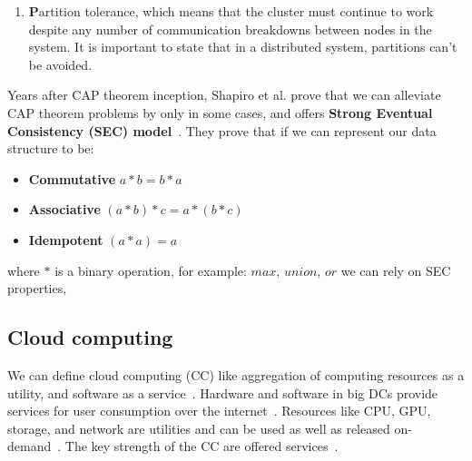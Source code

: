\begin{enumerate} [start=1,label={(\bfseries \arabic*)}]
	We can calculate availability class if we have system availability $A$, the system's availability class is define as~\cite{GrayS91}: 
	
	\begin{equation} 
		e^{\log_{10} \frac{1}{ (1 - A)}} 
	\end{equation}
	It is important to notice that even a 99\% available system gives almost four days of downtime in a year, which is unacceptable for services like Facebook, Google, AWS etc. And when service is down, companies are loosing customers.
	\item \textbf{P}artition tolerance, which means that the cluster must continue to work despite any number of communication breakdowns between nodes in the system. It is important to state that in a distributed system, partitions can’t be avoided.
\end{enumerate}

Years after CAP theorem inception, Shapiro et al. prove that we can alleviate CAP theorem problems by only in some cases, and offers \textbf{Strong Eventual Consistency (SEC) model}~\cite{ShapiroPBZ11}. They prove that if we can represent our data structure to be: \label{crdts}

\begin{itemize}
	\item \textbf{Commutative} $a*b = b*a$ 
	\item \textbf{Associative} $(a*b)*c = a*(b*c)$ 
	\item \textbf{Idempotent} $(a * a) = a$ 
\end{itemize}

\noindent
where $*$ is a binary operation, for example: $max$, $union$, $or$ we can rely on SEC properties,
%
%
\subsection{Cloud computing}\label{sec:cloud_computing}
%
We can define cloud computing (CC) like aggregation of computing resources as a utility, and software as a service~\cite{Vogels}. Hardware and software in big DCs provide services for user consumption over the internet~\cite{AboveTheCloud}. Resources like CPU, GPU, storage, and network are utilities and can be used as well as released on-demand~\cite{ZhangCB10}. The key strength of the CC are offered services~\cite{Vogels}. 

